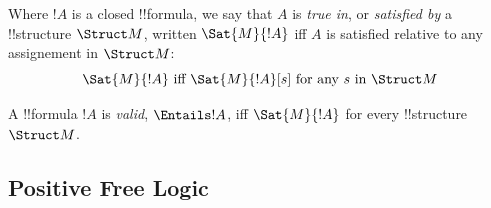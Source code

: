 \documentclass[../../../../include/open-logic-chapter]{subfiles}
\begin{document}
\begin{defn}[Satisfaction]
\begin{enumerate}



\end{enumerate}
\end{defn}

\begin{defn}[Truth]
Where $!A$ is a closed !!{formula}, we say that $A$ is \emph{true in}, or
\emph{satisfied by} a !!{structure} $\Struct M$, written $\Sat{M}{!A}$ iff 
$A$ is satisfied relative to any assignement in $\Struct M$:
$$\Sat{M}{!A}\textrm{ iff }\Sat{M}{!A}[s]\textrm{ for any }s\textrm{ in }\Struct M$$
\end{defn}

\begin{defn}[Validity]
  A !!{formula} $!A$ is \emph{valid}, $\Entails !A$, iff $\Sat{M}{!A}$ for every
  !!{structure}~$\Struct M$.
\end{defn}

\subsection{Positive Free Logic}
\end{document}
